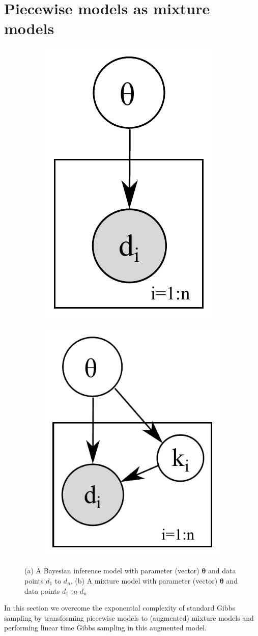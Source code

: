 \section{Piecewise models as mixture models}
\label{sect:mix}

\begin{figure}
\centering
\begin{subfigure}{.49\textwidth}
\centering
\includegraphics[width=.28\textwidth]{pic/naive.pdf}
\caption{}
\label{fig:naive}
\end{subfigure}
\begin{subfigure}{.49\textwidth}
\centering
  \includegraphics[width=.35\textwidth]{pic/naive-mix2.pdf}
\caption{}
\label{fig:naive.mix}
\end{subfigure}
\caption{\footnotesize 
(a) A Bayesian inference model with parameter (vector) $\boldsymbol\theta$ and data points $d_1$ to $d_n$.
(b) A mixture model with parameter (vector) $\boldsymbol\theta$ and data points $d_1$ to $d_n$ 
}
\end{figure}

In this section we overcome the exponential complexity of standard Gibbs
sampling by transforming piecewise models to (augmented) mixture models and performing
linear time Gibbs sampling in this augmented model.  

